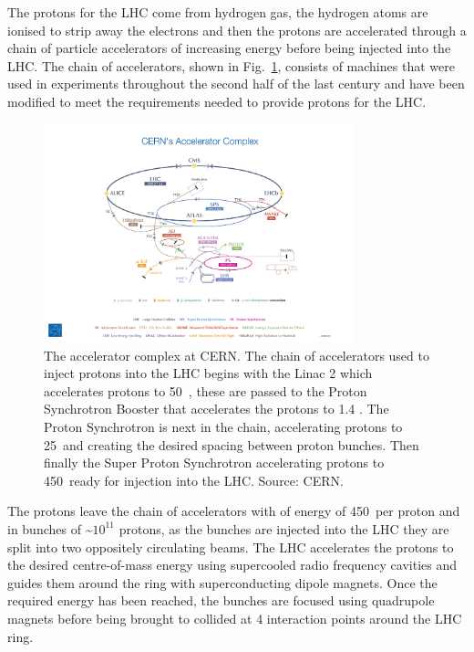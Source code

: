 The protons for the LHC come from hydrogen gas, %
the hydrogen atoms are ionised to strip away the electrons and then the protons are accelerated through a chain of particle accelerators of increasing energy before being injected into the LHC. The chain of accelerators, shown in Fig.~\ref{fig:accelerator_chain}, consists of machines that were used in experiments throughout the second half of the last century and have been modified to meet the requirements needed to provide protons for the LHC. 
\begin{figure}[htbp!]
  \centering
  \includegraphics[trim = 125mm 2mm 125mm 90mm, clip, width=0.8\textwidth]{./Figs/LHC_LHCb/accelerator_complex.jpg}
  \caption{The accelerator complex at CERN. The chain of accelerators used to inject protons into the LHC begins with the Linac 2 which accelerates protons to 50~\mev, these are passed to the Proton Synchrotron Booster that accelerates the protons to 1.4 \gev. The Proton Synchrotron is next in the chain, accelerating protons to 25~\gev and creating the desired spacing between proton bunches. Then finally the Super Proton Synchrotron accelerating protons to 450~\gev ready for injection into the LHC. Source: CERN.}
  \label{fig:accelerator_chain}
\end{figure}



The protons leave the chain of accelerators with of energy of 450~\gev per proton and in bunches of \~$10^{11}$ protons, as the bunches are injected into the LHC they are split into two oppositely circulating beams.
The LHC accelerates the protons to the desired centre-of-mass energy using supercooled radio frequency cavities and guides them around the ring with superconducting dipole magnets. %
Once the required energy has been reached, the bunches are focused using quadrupole magnets before being brought to collided at 4 interaction points around the LHC ring.%

